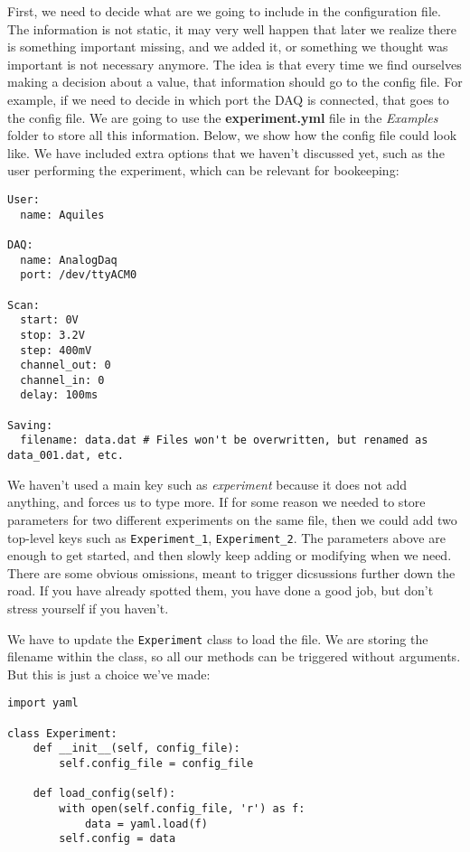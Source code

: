 First, we need to decide what are we going to include in the configuration file. The information is not static, it may very well happen that later we realize there is something important missing, and we added it, or something we thought was important is not necessary anymore. The idea is that every time we find ourselves making a decision about a value, that information should go to the config file. For example, if we need to decide in which port the DAQ is connected, that goes to the config file. We are going to use the \textbf{experiment.yml} file in the \emph{Examples} folder to store all this information. Below, we show how the config file could look like. We have included extra options that we haven't discussed yet, such as the user performing the experiment, which can be relevant for bookeeping:

\begin{verbatim}
User:
  name: Aquiles

DAQ:
  name: AnalogDaq
  port: /dev/ttyACM0

Scan:
  start: 0V
  stop: 3.2V
  step: 400mV
  channel_out: 0
  channel_in: 0
  delay: 100ms

Saving:
  filename: data.dat # Files won't be overwritten, but renamed as data_001.dat, etc.
\end{verbatim}

We haven't used a main key such as \emph{experiment} because it does not add anything, and forces us to type more. If for some reason we needed to store parameters for two different experiments on the same file, then we could add two top-level keys such as \texttt{Experiment\_1}, \texttt{Experiment\_2}. The parameters above are enough to get started, and then slowly keep adding or modifying when we need. There are some obvious omissions, meant to trigger dicsussions further down the road. If you have already spotted them, you have done a good job, but don't stress yourself if you haven't. 

We have to update the \texttt{Experiment} class to load the file. We are storing the filename within the class, so all our methods can be triggered without arguments. But this is just a choice we've made:

\begin{verbatim}
import yaml
 
class Experiment:
    def __init__(self, config_file):
        self.config_file = config_file

    def load_config(self):
        with open(self.config_file, 'r') as f:
            data = yaml.load(f)
        self.config = data
\end{verbatim}

